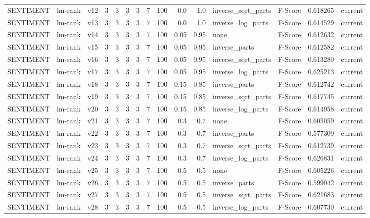 \documentclass{article}
\begin{document}
\begin{xltabular}{\linewidth}{@{}lYcrrrrrrrrYlrl@{}}
SENTIMENT & lm-rank & v12 & 3 & 3 & 3 & 3 & 7 & 100 & 0.0 & 1.0 & inverse\_sqrt\_parts & F-Score & 0.618265 & current \\
SENTIMENT & lm-rank & v13 & 3 & 3 & 3 & 3 & 7 & 100 & 0.0 & 1.0 & inverse\_log\_parts & F-Score & 0.614529 & current \\
SENTIMENT & lm-rank & v14 & 3 & 3 & 3 & 3 & 7 & 100 & 0.05 & 0.95 & none & F-Score & 0.612632 & current \\
SENTIMENT & lm-rank & v15 & 3 & 3 & 3 & 3 & 7 & 100 & 0.05 & 0.95 & inverse\_parts & F-Score & 0.612582 & current \\
SENTIMENT & lm-rank & v16 & 3 & 3 & 3 & 3 & 7 & 100 & 0.05 & 0.95 & inverse\_sqrt\_parts & F-Score & 0.613280 & current \\
SENTIMENT & lm-rank & v17 & 3 & 3 & 3 & 3 & 7 & 100 & 0.05 & 0.95 & inverse\_log\_parts & F-Score & 0.625213 & current \\
SENTIMENT & lm-rank & v18 & 3 & 3 & 3 & 3 & 7 & 100 & 0.15 & 0.85 & inverse\_parts & F-Score & 0.612742 & current \\
SENTIMENT & lm-rank & v19 & 3 & 3 & 3 & 3 & 7 & 100 & 0.15 & 0.85 & inverse\_sqrt\_parts & F-Score & 0.617745 & current \\
SENTIMENT & lm-rank & v20 & 3 & 3 & 3 & 3 & 7 & 100 & 0.15 & 0.85 & inverse\_log\_parts & F-Score & 0.614958 & current \\
SENTIMENT & lm-rank & v21 & 3 & 3 & 3 & 3 & 7 & 100 & 0.3 & 0.7 & none & F-Score & 0.605059 & current \\
SENTIMENT & lm-rank & v22 & 3 & 3 & 3 & 3 & 7 & 100 & 0.3 & 0.7 & inverse\_parts & F-Score & 0.577309 & current \\
SENTIMENT & lm-rank & v23 & 3 & 3 & 3 & 3 & 7 & 100 & 0.3 & 0.7 & inverse\_sqrt\_parts & F-Score & 0.612739 & current \\
SENTIMENT & lm-rank & v24 & 3 & 3 & 3 & 3 & 7 & 100 & 0.3 & 0.7 & inverse\_log\_parts & F-Score & 0.626831 & current \\
SENTIMENT & lm-rank & v25 & 3 & 3 & 3 & 3 & 7 & 100 & 0.5 & 0.5 & none & F-Score & 0.605226 & current \\
SENTIMENT & lm-rank & v26 & 3 & 3 & 3 & 3 & 7 & 100 & 0.5 & 0.5 & inverse\_parts & F-Score & 0.599042 & current \\
SENTIMENT & lm-rank & v27 & 3 & 3 & 3 & 3 & 7 & 100 & 0.5 & 0.5 & inverse\_sqrt\_parts & F-Score & 0.621683 & current \\
SENTIMENT & lm-rank & v28 & 3 & 3 & 3 & 3 & 7 & 100 & 0.5 & 0.5 & inverse\_log\_parts & F-Score & 0.607730 & current \\

\end{xltabular}
\end{document}
